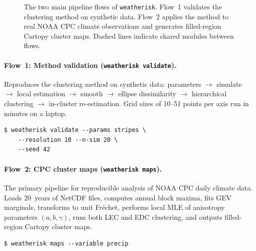 \documentclass[a4paper]{elsarticle}
\begin{document}
\begin{figure}[ht]
{%
}%
\caption{The two main pipeline flows of \texttt{weatherisk}.
  Flow~1 validates the clustering method on synthetic data.
  Flow~2 applies the method to real NOAA CPC climate observations
  and generates filled-region Cartopy cluster maps.
  Dashed lines indicate shared modules between flows.}
\label{fig:flows}
\end{figure}

\paragraph{Flow~1: Method validation (\texttt{weatherisk validate}).}
Reproduces the clustering method on synthetic data:
parameters $\to$ simulate $\to$ local estimation $\to$ smooth $\to$
ellipse dissimilarity $\to$ hierarchical clustering $\to$ in-cluster
re-estimation.
Grid sizes of 10--51 points per axis run in minutes on a laptop.

\begin{lstlisting}[caption={Running the validation flow.},label=lst:validate]
$ weatherisk validate --params stripes \
    --resolution 10 --n-sim 20 \
    --seed 42
\end{lstlisting}

\paragraph{Flow~2: CPC cluster maps (\texttt{weatherisk maps}).}
The primary pipeline for reproducible analysis of NOAA CPC daily climate
data.  Loads 20~years of NetCDF files, computes annual block maxima,
fits GEV marginals, transforms to unit Fr\'{e}chet, performs local MLE of
anisotropy parameters $(a, b, \gamma)$, runs both LEC and EDC clustering,
and outputs filled-region Cartopy cluster maps.

\begin{lstlisting}[caption={Running the CPC maps pipeline.},label=lst:maps]
$ weatherisk maps --variable precip
\end{lstlisting}
\end{document}
